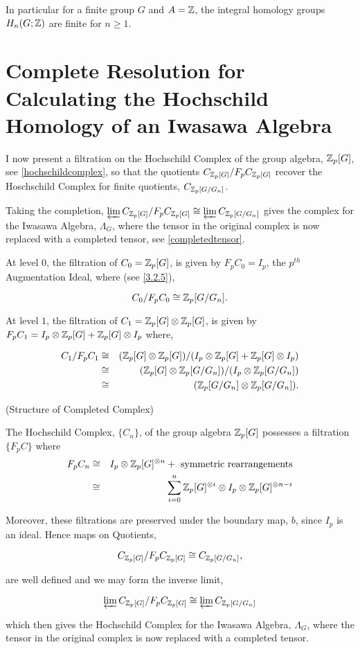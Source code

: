 In particular for a finite group $G$ and $A = \mathbb Z$, the integral homology groups $H_n(G;\mathbb Z)$ are finite for $n \geq 1$. 

\section{Complete Resolution for Calculating the Hochschild Homology of an Iwasawa Algebra}

I now present a filtration on the Hochschild Complex of the group algebra, $\mathbb Z_p[G]$, see \ref{hochschildcomplex}, so that the quotients $C_{\mathbb Z_p[G]} / F_p C_{\mathbb Z_p[G]}$ recover the Hoschschild Complex for finite quotients, $C_{\mathbb Z_p[G/G_n]}$. 

Taking the completion, $\varprojlim C_{\mathbb Z_p[G]} / F_p C_{\mathbb Z_p [G]} \cong \varprojlim C_{\mathbb Z_p[G/G_n]}$ gives the complex for the Iwasawa Algebra, $\Lambda_G$, where the tensor in the original complex is now replaced with a completed tensor, see \ref{completedtensor}.

At level $0$, the filtration of $C_0 = \mathbb Z_p[G]$, is given by $F_p C_0 = I_p$, the $p^{th}$ Augmentation Ideal, where (see \ref{3.2.5}),

$$ C_0 / F_p C_0 \cong \mathbb Z_p [G/G_n].$$

At level $1$, the filtration of $C_1 = \mathbb Z_p[G] \otimes \mathbb Z_p[G]$, is given by $F_p C_1 = I_p \otimes \mathbb Z_p[G] + \mathbb Z_p[G] \otimes I_p$ where,

\begin{eqnarray*}
C_1 / F_p C_1 &\cong& (\mathbb Z_p[G] \otimes \mathbb Z_p[G]) / ( I_p \otimes \mathbb Z_p[G] + \mathbb Z_p[G] \otimes I_p)\\
				&\cong& (\mathbb Z_p[G] \otimes \mathbb Z_p[G/G_n]) / ( I_p \otimes \mathbb Z_p[G/G_n])\\
				&\cong& (\mathbb Z_p[G/G_n] \otimes \mathbb Z_p[G/G_n]).
\end{eqnarray*}

\begin{proposition}(Structure of Completed Complex)

The Hochschild Complex, $\{C_n\}$, of the group algebra $\mathbb Z_p[G]$ possesses a filtration $\{F_pC\}$ where
\begin{eqnarray*}
F_p C_n 	&\cong& I_p \otimes \mathbb Z_p[G]^{\otimes n} + \text{ symmetric rearrangements}\\
		&\cong& \sum_{i=0}^n \mathbb Z_p[G]^{\otimes i} \otimes I_p \otimes \mathbb Z_p[G]^{\otimes n-i}
\end{eqnarray*}

Moreover, these filtrations are preserved under the boundary map, $b$, since $I_p$ is an ideal. Hence maps on Quotients,

$$C_{\mathbb Z_p[G]} / F_p C_{\mathbb Z_p[G]} \cong C_{\mathbb Z_p[G/G_n]},$$

are well defined and we may form the inverse limit, 

$$\varprojlim C_{\mathbb Z_p[G]} / F_p C_{\mathbb Z_p [G]} \cong \varprojlim C_{\mathbb Z_p[G/G_n]}$$

which then gives the Hochschild Complex for the Iwasawa Algebra, $\Lambda_G$, where the tensor in the original complex is now replaced with a completed tensor.
\end{proposition}

